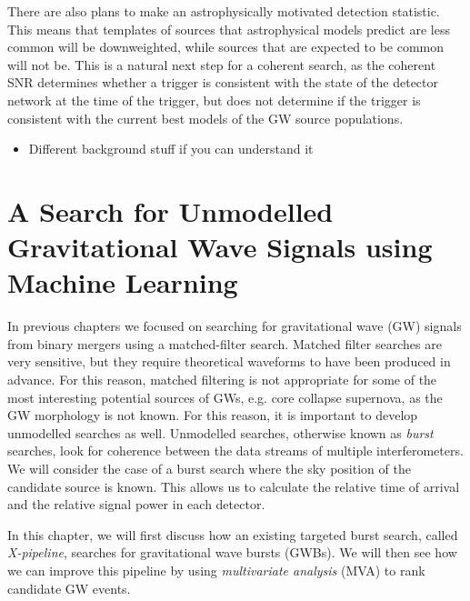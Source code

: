\documentclass[11pt]{cuthesis}
\begin{document}
There are also plans to make an astrophysically motivated detection statistic. This means that templates of sources that astrophysical models predict are less common will be downweighted, while sources that are expected to be common will not be. This is a natural next step for a coherent search, as the coherent SNR determines whether a trigger is consistent with the state of the detector network at the time of the trigger, but does not determine if the trigger is consistent with the current best models of the GW source populations.

\begin{itemize}
\item Different background stuff if you can understand it
\end{itemize}

\chapter{A Search for Unmodelled Gravitational Wave Signals using Machine Learning} \label{chap: mva}

In previous chapters we focused on searching for gravitational wave (GW) signals from binary mergers using a matched-filter search. Matched filter searches are very sensitive, but they require theoretical waveforms to have been produced in advance. For this reason, matched filtering is not appropriate for some of the most interesting potential sources of GWs, e.g. core collapse supernova, as the GW morphology is not known. For this reason, it is important to develop unmodelled searches as well. Unmodelled searches, otherwise known as \textit{burst} searches, look for coherence between the data streams of multiple interferometers. We will consider the case of a burst search where the sky position of the candidate source is known. This allows us to calculate the relative time of arrival and the relative signal power in each detector.

In this chapter, we will first discuss how an existing targeted burst search, called \textit{X-pipeline}, searches for gravitational wave bursts (GWBs). We will then see how we can improve this pipeline by using \textit{multivariate analysis} (MVA) to rank candidate GW events.  
\end{document}
